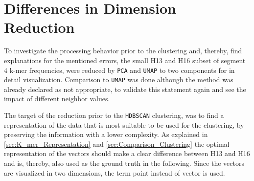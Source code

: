 \section{Differences in Dimension Reduction} \label{sec:Dimension_Reduction}

To investigate the processing behavior prior to the clustering and, thereby, find explanations for the mentioned errors, the small H13 and H16 subset of segment 4 k-mer frequencies, were reduced by \texttt{PCA} and \texttt{UMAP} to two components for in detail visualization. Comparison to \texttt{UMAP} was done although the method was already declared as not appropriate, to validate this statement again and see the impact of different neighbor values. 

\vspace{1em}

The target of the reduction prior to the \texttt{HDBSCAN} clustering, was to find a representation of the data that is most suitable to be used for the clustering, by preserving the information with a lower complexity. As explained in \autoref{sec:K_mer_Representation} and \autoref{sec:Comparison_Clustering} the optimal representation of the vectors should make a clear difference between H13 and H16 and is, thereby, also used as the ground truth in the following. Since the vectors are visualized in two dimensions, the term point instead of vector is used.

